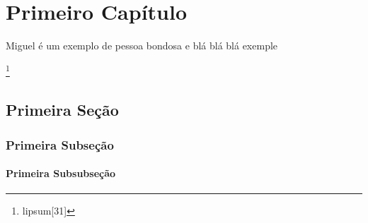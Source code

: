 \documentclass[
	12pt,				%
	openright,			%
	oneside,			%
	a4paper,			%
	english,			%
	french,				%
	spanish,			%
	brazil,sumario=tradicional				%
	]{UFPE-DCP} %
\makeatletter
\newlength\interepigraphskip
\renewcommand\epigraph[3][\interepigraphskip]{\vspace{\beforeepigraphskip}
  {\epigraphsize\begin{\epigraphflush}\begin{minipage}{\epigraphwidth}
    \@epitext{#2}\\[#1] \@episource{#3}
    \end{minipage}\end{\epigraphflush}
    \vspace{\afterepigraphskip}}}
\makeatother
\begin{document}
\chapter{Primeiro Capítulo}




\OnehalfSpacing %
Miguel é um exemplo de pessoa bondosa e blá blá blá exemple \lipsum[2]
\lipsum[31]

\lipsum[31]

\lipsum[31]

\lipsum[31]

\lipsum[31]
\pagestyle{texto}
\lipsum[31]

\lipsum[31]\footnote{lipsum[31]}

\lipsum[31]

\lipsum[31]
\section{Primeira Seção} 

\lipsum[31]

\lipsum[31]

\lipsum[31]

\lipsum[31]

\lipsum[31]

\subsection{Primeira Subseção}

\lipsum[31]

\lipsum[31]

\lipsum[31]

\lipsum[31]

\lipsum[31]

\lipsum[31]
\subsubsection{ Primeira Subsubseção}
\end{document}
